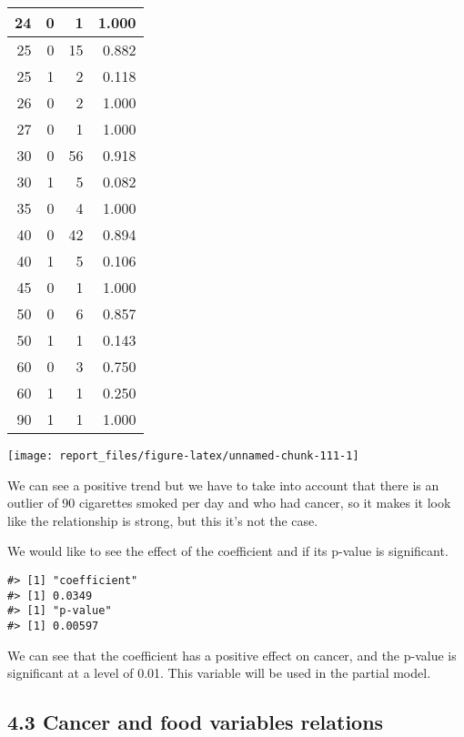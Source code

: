 \documentclass[
]{article}
\begin{document}
\begin{table}
\begin{tabular}[t]{r|r|r|r}
24 & 0 & 1 & 1.000\\
\hline
25 & 0 & 15 & 0.882\\
\hline
25 & 1 & 2 & 0.118\\
\hline
26 & 0 & 2 & 1.000\\
\hline
27 & 0 & 1 & 1.000\\
\hline
30 & 0 & 56 & 0.918\\
\hline
30 & 1 & 5 & 0.082\\
\hline
35 & 0 & 4 & 1.000\\
\hline
40 & 0 & 42 & 0.894\\
\hline
40 & 1 & 5 & 0.106\\
\hline
45 & 0 & 1 & 1.000\\
\hline
50 & 0 & 6 & 0.857\\
\hline
50 & 1 & 1 & 0.143\\
\hline
60 & 0 & 3 & 0.750\\
\hline
60 & 1 & 1 & 0.250\\
\hline
90 & 1 & 1 & 1.000\\
\hline
\end{tabular}
\end{table}

\begin{center}\texttt{[image: report\_files/figure-latex/unnamed-chunk-111-1]} \end{center}

We can see a positive trend but we have to take into account that there
is an outlier of 90 cigarettes smoked per day and who had cancer, so it
makes it look like the relationship is strong, but this it's not the
case.

We would like to see the effect of the coefficient and if its p-value is
significant.

\begin{verbatim}
#> [1] "coefficient"
#> [1] 0.0349
#> [1] "p-value"
#> [1] 0.00597
\end{verbatim}

We can see that the coefficient has a positive effect on cancer, and the
p-value is significant at a level of 0.01. This variable will be used in
the partial model.

\hypertarget{cancer-and-food-variables-relations}{%
\subsection{4.3 Cancer and food variables
relations}\label{cancer-and-food-variables-relations}}
\end{document}

